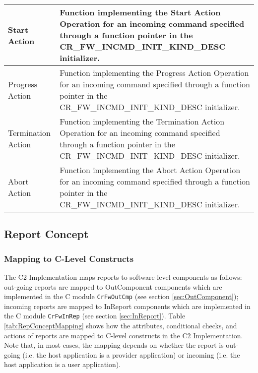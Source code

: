 \documentclass{pnp_article}
\begin{document}
\begin{longtable}{|>{\raggedright}p{2.0cm}|p{11.3cm}|}
Start Action & Function implementing the Start Action Operation for an incoming command specified through a function pointer in the CR\_FW\_INCMD\_INIT\_KIND\_DESC initializer. \\
\hline
Progress Action & Function implementing the Progress Action Operation for an incoming command specified through a function pointer in the CR\_FW\_INCMD\_INIT\_KIND\_DESC initializer. \\
\hline
Termination Action & Function implementing the Termination Action Operation for an incoming command specified through a function pointer in the CR\_FW\_INCMD\_INIT\_KIND\_DESC initializer. \\
\hline
Abort Action & Function implementing the Abort Action Operation for an incoming command specified through a function pointer in the CR\_FW\_INCMD\_INIT\_KIND\_DESC initializer. \\
\hline
\end{longtable}


\subsection{Report Concept }\label{sec:RepConcept}


\subsubsection{Mapping to C-Level Constructs}\label{sec:RepConceptMapping}
The C2 Implementation maps reports to software-level components as follows: out-going reports are mapped to OutComponent components which are implemented in the C module \texttt{CrFwOutCmp} (see section \ref{sec:OutComponent}); incoming reports are mapped to InReport components which are implemented in the C module \texttt{CrFwInRep} (see section \ref{sec:InReport}). Table \ref{tab:RepConceptMapping} shows how the attributes, conditional checks, and actions of reports are mapped to C-level constructs in the C2 Implementation. Note that, in most cases, the mapping depends on whether the report is out-going (i.e. the host application is a provider application) or incoming (i.e. the host application is a user application).
\end{document}
